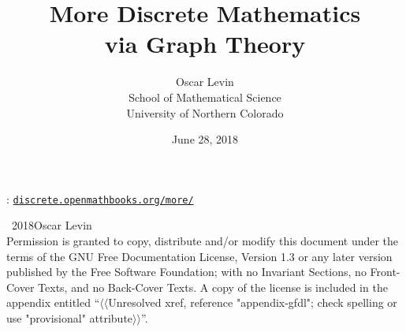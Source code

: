 \documentclass[10pt,]{book}
\title{More Discrete Mathematics\\
{\large via Graph Theory}}
\author{Oscar Levin\\
School of Mathematical Science\\
University of Northern Colorado
}
\date{June 28, 2018}
\newcommand{\mono}[1]{\texttt{#1}}
\theoremstyle{plain}
\theoremstyle{definition}
\theoremstyle{definition}
\theoremstyle{definition}
\numberwithin{equation}{chapter}
\begin{document}
\frontmatter

\thispagestyle{empty}
\hypertarget{colophon-1}{}
: \href{http://discrete.openmathbooks.org/more/}{\mono{discrete.openmathbooks.org/more/}}\par\medskip
\noindent\textcopyright\ 2018\quad{}Oscar Levin\\[0.5\baselineskip]
Permission is granted to copy, distribute and/or modify this document under the terms of the GNU Free Documentation License, Version 1.3 or any later version published by the Free Software Foundation; with no Invariant Sections, no Front-Cover Texts, and no Back-Cover Texts.  A copy of the license is included in the appendix entitled ``{$\langle\langle$Unresolved xref, reference "appendix-gfdl"; check spelling or use "provisional" attribute$\rangle\rangle$}\hyperlink{}{}''.\par\medskip
{}
\null\clearpage
\end{document}
